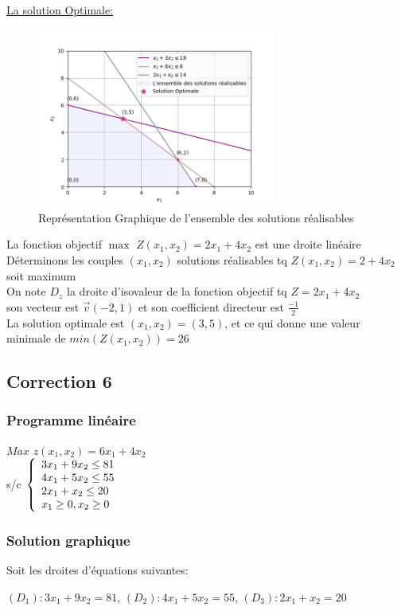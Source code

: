\documentclass[]{book}
\begin{document}
\underline{La solution Optimale:}
\begin{figure}[H]
    \centering
    \includegraphics[width=0.7\textwidth]{Figures/figure_05.png}
    \caption{Représentation Graphique de l'ensemble des solutions réalisables}
    \label{fig:placeholder}
\end{figure}

La fonction objectif $\max$ $Z(x_1,x_2) = 2x_1 + 4x_2$ est une droite linéaire\\
Déterminons les couples $(x_1, x_2)$ solutions réalisables tq $Z(x_1,x_2) = 2 + 4x_2$ soit maximum\\
On note $D_z$ la droite d'isovaleur de la fonction objectif tq $Z = 2x_1 + 4x_2$\\
son vecteur est $\Vec{v}(-2,1)$ et son coefficient directeur est $\frac{-1}{2}$\\
La solution optimale est $(x_1,x_2)=(3,5)$, et ce qui donne une valeur minimale de $min(Z(x_1,x_2)) = 26 $


\subsection*{Correction 6}
\subsubsection{Programme linéaire}
    $Max$ $z(x_1,x_2) = 6x_1 + 4x_2$\\
s/c $\left\{
	\begin{array}l
	3x_1 + 9x_2 \leq 81\\
    4x_1 + 5x_2 \leq 55\\
    2x_1 + x_2 \leq 20\\
	x_1 \geq 0, x_2 \geq 0\end{array}
	\right.$
\subsubsection{Solution graphique}
Soit les droites d’équations suivantes:
\begin{center}
    $(D_1): 3x_1 + 9x_2 = 81$, $(D_2): 4x_1 + 5x_2 = 55$, $(D_3): 2x_1 + x_2 = 20$
\end{center}
\end{document}

